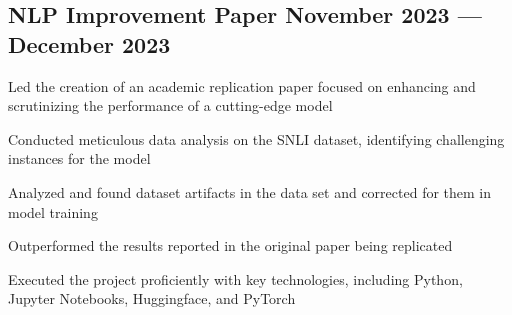 



\subsection{{NLP Improvement Paper \hfill November 2023 --- December 2023}}
\begin{zitemize}
\begin{zitemize}
\item Led the creation of an academic replication paper focused on enhancing and scrutinizing the performance of a cutting-edge model
\item Conducted meticulous data analysis on the SNLI dataset, identifying challenging instances for the model
\item Analyzed and found dataset artifacts in the data set and corrected for them in model training
\item Outperformed the results reported in the original paper being replicated
\item Executed the project proficiently with key technologies, including Python, Jupyter Notebooks, Huggingface, and PyTorch
\end{zitemize}
\end{zitemize}

